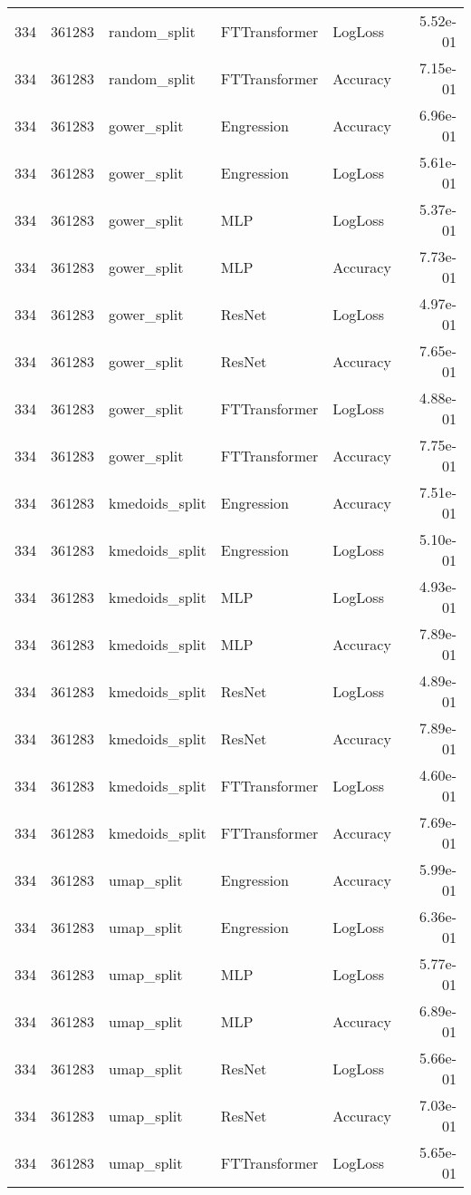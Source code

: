\begin{tabular}{rrlllr}
334 & 361283 & random\_split & FTTransformer & LogLoss & 5.52e-01 \\
334 & 361283 & random\_split & FTTransformer & Accuracy & 7.15e-01 \\
334 & 361283 & gower\_split & Engression & Accuracy & 6.96e-01 \\
334 & 361283 & gower\_split & Engression & LogLoss & 5.61e-01 \\
334 & 361283 & gower\_split & MLP & LogLoss & 5.37e-01 \\
334 & 361283 & gower\_split & MLP & Accuracy & 7.73e-01 \\
334 & 361283 & gower\_split & ResNet & LogLoss & 4.97e-01 \\
334 & 361283 & gower\_split & ResNet & Accuracy & 7.65e-01 \\
334 & 361283 & gower\_split & FTTransformer & LogLoss & 4.88e-01 \\
334 & 361283 & gower\_split & FTTransformer & Accuracy & 7.75e-01 \\
334 & 361283 & kmedoids\_split & Engression & Accuracy & 7.51e-01 \\
334 & 361283 & kmedoids\_split & Engression & LogLoss & 5.10e-01 \\
334 & 361283 & kmedoids\_split & MLP & LogLoss & 4.93e-01 \\
334 & 361283 & kmedoids\_split & MLP & Accuracy & 7.89e-01 \\
334 & 361283 & kmedoids\_split & ResNet & LogLoss & 4.89e-01 \\
334 & 361283 & kmedoids\_split & ResNet & Accuracy & 7.89e-01 \\
334 & 361283 & kmedoids\_split & FTTransformer & LogLoss & 4.60e-01 \\
334 & 361283 & kmedoids\_split & FTTransformer & Accuracy & 7.69e-01 \\
334 & 361283 & umap\_split & Engression & Accuracy & 5.99e-01 \\
334 & 361283 & umap\_split & Engression & LogLoss & 6.36e-01 \\
334 & 361283 & umap\_split & MLP & LogLoss & 5.77e-01 \\
334 & 361283 & umap\_split & MLP & Accuracy & 6.89e-01 \\
334 & 361283 & umap\_split & ResNet & LogLoss & 5.66e-01 \\
334 & 361283 & umap\_split & ResNet & Accuracy & 7.03e-01 \\
334 & 361283 & umap\_split & FTTransformer & LogLoss & 5.65e-01 \\

\end{tabular}
